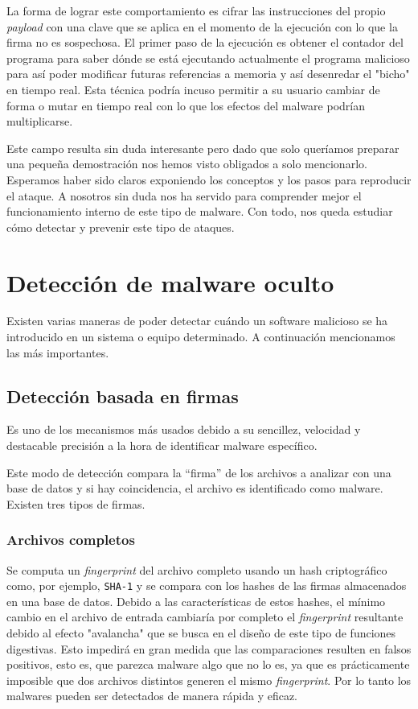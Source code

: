 \documentclass[12pt]{article}
\newcommand{\newpar} {
    \vskip 0.5cm
}
\begin{document}
                \newpar

                La forma de lograr este comportamiento es cifrar las instrucciones del propio \textit{payload} con una clave que se aplica en el momento de la ejecución con lo que la firma no es sospechosa. El primer paso de la ejecución es obtener el contador del programa para saber dónde se está ejecutando actualmente el programa malicioso para así poder modificar futuras referencias a memoria y así desenredar el "bicho" en tiempo real. Esta técnica podría incuso permitir a su usuario cambiar de forma o mutar en tiempo real con lo que los efectos del malware podrían multiplicarse.

                \newpar

                Este campo resulta sin duda interesante pero dado que solo queríamos preparar una pequeña demostración nos hemos visto obligados a solo mencionarlo. Esperamos haber sido claros exponiendo los conceptos y los pasos para reproducir el ataque. A nosotros sin duda nos ha servido para comprender mejor el funcionamiento interno de este tipo de malware. Con todo, nos queda estudiar cómo detectar y prevenir este tipo de ataques.

    \section{Detección de malware oculto}
        Existen varias maneras de poder detectar cuándo un software malicioso se ha introducido en un sistema o equipo determinado. A continuación mencionamos las más importantes.

        \subsection{Detección basada en firmas}
            Es uno de los mecanismos más usados debido a su sencillez, velocidad y destacable precisión a la hora de identificar malware específico.

            \newpar

            Este modo de detección compara la “firma” de los archivos a analizar con una base de datos y si hay coincidencia, el archivo es identificado como malware. Existen tres tipos de firmas.

            \subsubsection{Archivos completos}
                Se computa un \textit{fingerprint} del archivo completo usando un hash criptográfico como, por ejemplo, \texttt{SHA-1} y se compara con los hashes de las firmas almacenados en una base de datos. Debido a las características de estos hashes, el mínimo cambio en el archivo de entrada cambiaría por completo el \textit{fingerprint} resultante debido al efecto "avalancha" que se busca en el diseño de este tipo de funciones digestivas. Esto impedirá en gran medida que las comparaciones resulten en falsos positivos, esto es, que parezca malware algo que no lo es, ya que es prácticamente imposible que dos archivos distintos generen el mismo \textit{fingerprint}. Por lo tanto los malwares pueden ser detectados de manera rápida y eficaz.
\end{document}
